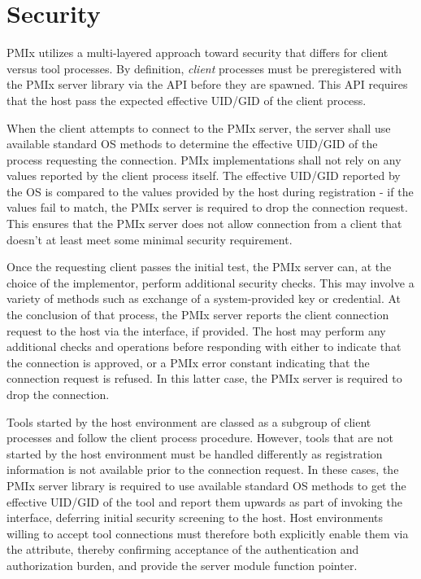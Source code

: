 \chapter{Security}
\label{chap:api_security}

\ac{PMIx} utilizes a multi-layered approach toward security that differs for client versus tool processes. By definition, \emph{client} processes must be preregistered with the \ac{PMIx} server library via the  \ac{API} before they are spawned. This \ac{API} requires that the host pass the expected effective \ac{UID}/\ac{GID} of the client process.

When the client attempts to connect to the \ac{PMIx} server, the server shall use available standard \ac{OS} methods to determine the effective \ac{UID}/\ac{GID} of the process requesting the connection. \ac{PMIx} implementations shall not rely on any values reported by the client process itself. The effective \ac{UID}/\ac{GID} reported by the \ac{OS} is compared to the values provided by the host during registration - if the values fail to match, the \ac{PMIx} server is required to drop the connection request. This ensures that the \ac{PMIx} server does not allow connection from a client that doesn't at least meet some minimal security requirement.

Once the requesting client passes the initial test, the \ac{PMIx} server can, at the choice of the implementor, perform additional security checks. This may involve a variety of methods such as exchange of a system-provided key or credential. At the conclusion of that process, the \ac{PMIx} server reports the client connection request to the host via the  interface, if provided. The host may perform any additional checks and operations before responding with either  to indicate that the connection is approved, or a \ac{PMIx} error constant indicating that the connection request is refused. In this latter case, the \ac{PMIx} server is required to drop the connection.

Tools started by the host environment are classed as a subgroup of client processes and follow the client process procedure. However, tools that are not started by the host environment must be handled differently as registration information is not available prior to the connection request. In these cases, the \ac{PMIx} server library is required to use available standard \ac{OS} methods to get the effective \ac{UID}/\ac{GID} of the tool and report them upwards as part of invoking the  interface, deferring initial security screening to the host. Host environments willing to accept tool connections must therefore both explicitly enable them via the  attribute, thereby confirming acceptance of the authentication and authorization burden, and provide the  server module function pointer.


